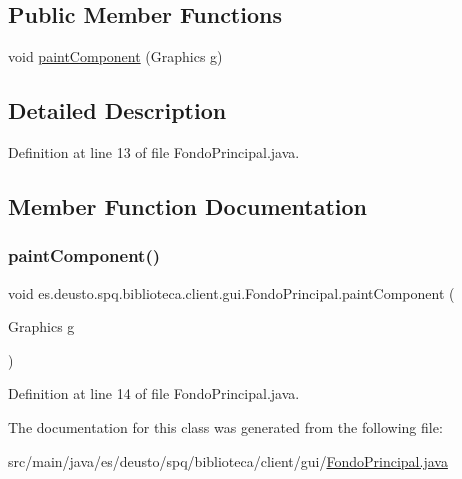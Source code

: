 \subsection*{Public Member Functions}
\begin{DoxyCompactItemize}
\item 
void \mbox{\hyperlink{classes_1_1deusto_1_1spq_1_1biblioteca_1_1client_1_1gui_1_1_fondo_principal_a16482941853688017e6315d733af0982}{paint\+Component}} (Graphics g)
\end{DoxyCompactItemize}


\subsection{Detailed Description}


Definition at line 13 of file Fondo\+Principal.\+java.



\subsection{Member Function Documentation}
\mbox{\label{classes_1_1deusto_1_1spq_1_1biblioteca_1_1client_1_1gui_1_1_fondo_principal_a16482941853688017e6315d733af0982}} 
\subsubsection{\texorpdfstring{paint\+Component()}{paintComponent()}}
{\footnotesize\ttfamily void es.\+deusto.\+spq.\+biblioteca.\+client.\+gui.\+Fondo\+Principal.\+paint\+Component (\begin{DoxyParamCaption}\item[{Graphics}]{g }\end{DoxyParamCaption})}



Definition at line 14 of file Fondo\+Principal.\+java.



The documentation for this class was generated from the following file\+:\begin{DoxyCompactItemize}
\item 
src/main/java/es/deusto/spq/biblioteca/client/gui/\mbox{\hyperlink{_fondo_principal_8java}{Fondo\+Principal.\+java}}\end{DoxyCompactItemize}
